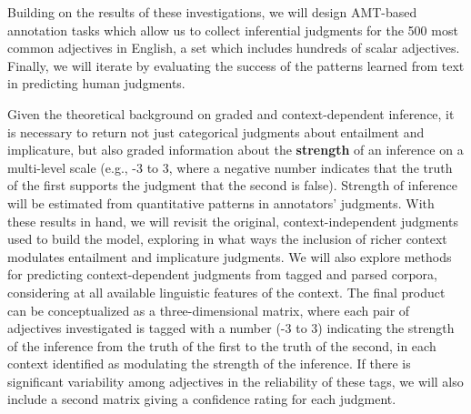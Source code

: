 \documentclass[10pt]{article}
\begin{document}
Building on the results of these investigations, we will design AMT-based annotation tasks which allow us to collect inferential judgments for the 500 most common adjectives in English, a set which includes hundreds of scalar adjectives. Finally, we will iterate by evaluating the success of the patterns learned from text in predicting human judgments.

Given the theoretical background on graded and context-dependent inference, it is necessary to return not just categorical judgments about entailment and implicature, but also graded information about the \textbf{strength} of an inference on a multi-level scale (e.g., -3 to 3, where a negative number indicates that the truth of the first supports the judgment that the second is false).  Strength of inference will be estimated from quantitative patterns in annotators' judgments. With these results in hand, we will revisit the original, context-independent judgments used to build the model, exploring in what ways the inclusion of richer context modulates entailment and implicature judgments. We will also explore methods for predicting context-dependent judgments from tagged and parsed corpora, considering at all available linguistic features of the context. The final product can be conceptualized as a three-dimensional matrix, where each pair of adjectives investigated is tagged with a number (-3 to 3) indicating the strength of the inference from the truth of the first to the truth of the second, in each context identified as modulating the strength of the inference. If there is significant variability among adjectives in the reliability of these tags, we will also include a second matrix giving a confidence rating for each judgment.
\end{document}

